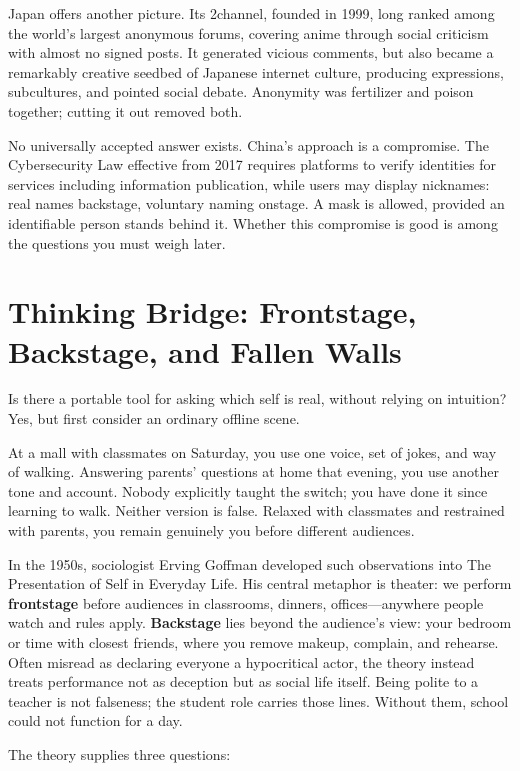Japan offers another picture. Its 2channel, founded in 1999, long ranked among the world's largest anonymous forums, covering anime through social criticism with almost no signed posts. It generated vicious comments, but also became a remarkably creative seedbed of Japanese internet culture, producing expressions, subcultures, and pointed social debate. Anonymity was fertilizer and poison together; cutting it out removed both.

No universally accepted answer exists. China's approach is a compromise. The Cybersecurity Law effective from 2017 requires platforms to verify identities for services including information publication, while users may display nicknames: real names backstage, voluntary naming onstage. A mask is allowed, provided an identifiable person stands behind it. Whether this compromise is good is among the questions you must weigh later.

\section[Frontstage, Backstage, and Fallen Walls]{Thinking Bridge: Frontstage, Backstage, and Fallen Walls}
Is there a portable tool for asking which self is real, without relying on intuition? Yes, but first consider an ordinary offline scene.

At a mall with classmates on Saturday, you use one voice, set of jokes, and way of walking. Answering parents' questions at home that evening, you use another tone and account. Nobody explicitly taught the switch; you have done it since learning to walk. Neither version is false. Relaxed with classmates and restrained with parents, you remain genuinely you before different audiences.

In the 1950s, sociologist Erving Goffman developed such observations into The Presentation of Self in Everyday Life. His central metaphor is theater: we perform \textbf{frontstage} before audiences in classrooms, dinners, offices---anywhere people watch and rules apply. \textbf{Backstage} lies beyond the audience's view: your bedroom or time with closest friends, where you remove makeup, complain, and rehearse. Often misread as declaring everyone a hypocritical actor, the theory instead treats performance not as deception but as social life itself. Being polite to a teacher is not falseness; the student role carries those lines. Without them, school could not function for a day.

The theory supplies three questions:

